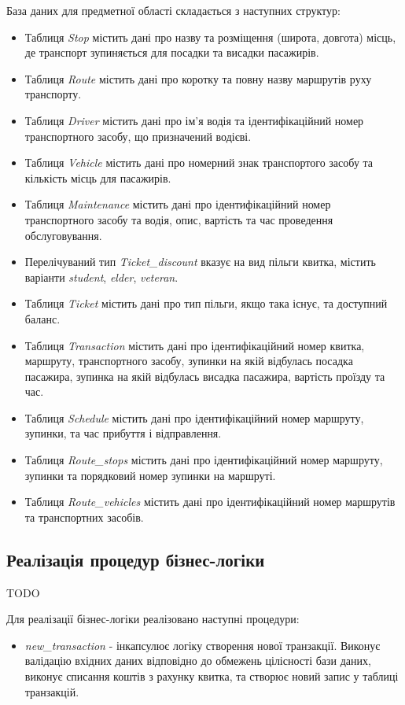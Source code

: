 \documentclass[oneside,14pt]{extarticle}
\begin{document}
База даних для предметної області складається з наступних структур:
\begin{itemize}
\item Таблиця \textit{Stop} містить дані про назву та розміщення (широта, довгота) місць, де транспорт зупиняється для посадки та висадки пасажирів.
\item Таблиця \textit{Route} містить дані про коротку та повну назву маршрутів руху транспорту.
\item Таблиця \textit{Driver} містить дані про ім'я водія та ідентифікаційний номер транспортного засобу, що призначений водієві.
\item Таблиця \textit{Vehicle} містить дані про номерний знак транспортого засобу та кількість місць для пасажирів.
\item Таблиця \textit{Maintenance} містить дані про ідентифікаційний номер транспортного засобу та водія, опис, вартість та час проведення обслуговування.
\item Перелічуваний тип \textit{Ticket\_discount} вказує на вид пільги квитка, містить варіанти \textit{student}, \textit{elder}, \textit{veteran}.
\item Таблиця \textit{Ticket} містить дані про тип пільги, якщо така існує, та доступний баланс.
\item Таблиця \textit{Transaction} містить дані про ідентифікаційний номер квитка, маршруту, транспортного засобу, зупинки на якій відбулась посадка пасажира, зупинка на якій відбулась висадка пасажира, вартість проїзду  та час.
\item Таблиця \textit{Schedule} містить дані про ідентифікаційний номер маршруту, зупинки, та час прибуття і відправлення.
\item Таблиця \textit{Route\_stops} містить дані про ідентифікаційний номер маршруту, зупинки та порядковий номер зупинки на маршруті.
\item Таблиця \textit{Route\_vehicles} містить дані про ідентифікаційний номер маршрутів та транспортних засобів.
\end{itemize}

\subsection{Реалізація процедур бізнес-логіки}
TODO

Для реалізації бізнес-логіки реалізовано наступні процедури:
\begin{itemize}
\item \textit{new\_transaction} - інкапсулює логіку створення нової транзакції. Виконує валідацію вхідних даних відповідно до обмежень цілісності бази даних, виконує списання коштів з рахунку квитка, та створює новий запис у таблиці транзакцій.
\end{itemize}
\end{document}
